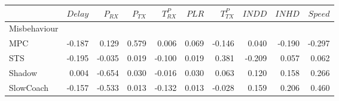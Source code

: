 \begin{tabular}{lrrrrrrrrr}
\toprule
{} &  $Delay$ &  $P_{RX}$ &  $P_{TX}$ &  $T^P_{RX}$ &  $PLR$ &  $T^P_{TX}$ &  $INDD$ &  $INHD$ &  $Speed$ \\
\midrule
Misbehaviour &          &           &           &             &        &             &         &         &          \\
MPC          &   -0.187 &     0.129 &     0.579 &       0.006 &  0.069 &      -0.146 &   0.040 &  -0.190 &   -0.297 \\
STS          &   -0.195 &    -0.035 &     0.019 &      -0.100 &  0.019 &       0.381 &  -0.209 &   0.057 &    0.062 \\
Shadow       &    0.004 &    -0.654 &     0.030 &      -0.016 &  0.030 &       0.063 &   0.120 &   0.158 &    0.266 \\
SlowCoach    &   -0.157 &    -0.533 &     0.013 &      -0.132 &  0.013 &      -0.028 &   0.159 &   0.206 &    0.460 \\
\bottomrule
\end{tabular}
